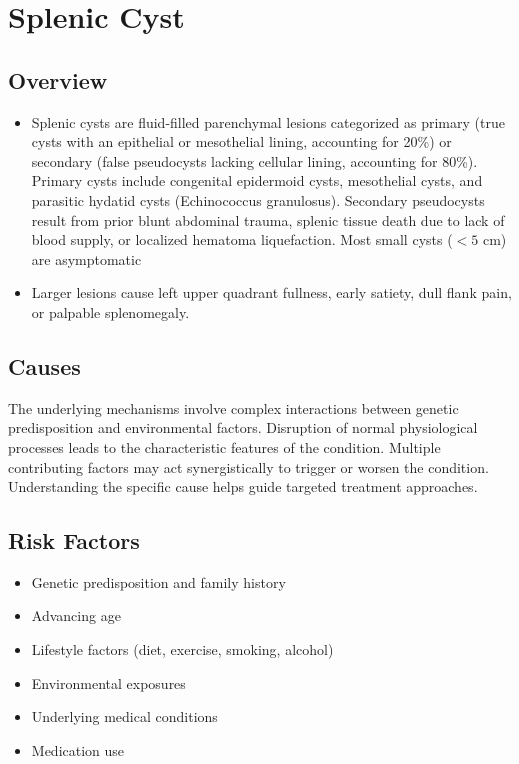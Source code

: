 \chapter{Splenic Cyst}
\label{sec:Splenic Cyst}

\section{Overview}


\begin{itemize}[noitemsep]
  \item Splenic cysts are fluid-filled parenchymal lesions categorized as primary (true cysts with an epithelial or mesothelial lining, accounting for 20\%) or secondary (false pseudocysts lacking cellular lining, accounting for 80\%). Primary cysts include congenital epidermoid cysts, mesothelial cysts, and parasitic hydatid cysts (Echinococcus granulosus). Secondary pseudocysts result from prior blunt abdominal trauma, splenic tissue death due to lack of blood supply, or localized hematoma liquefaction. Most small cysts ($<5$ cm) are asymptomatic
  \item Larger lesions cause left upper quadrant fullness, early satiety, dull flank pain, or palpable splenomegaly.
\end{itemize}
\section{Causes}
The underlying mechanisms involve complex interactions between genetic predisposition and environmental factors. Disruption of normal physiological processes leads to the characteristic features of the condition. Multiple contributing factors may act synergistically to trigger or worsen the condition. Understanding the specific cause helps guide targeted treatment approaches.
\section{Risk Factors}


\begin{itemize}[noitemsep]
  \item Genetic predisposition and family history
  \item Advancing age
  \item Lifestyle factors (diet, exercise, smoking, alcohol)
  \item Environmental exposures
  \item Underlying medical conditions
  \item Medication use
\end{itemize}

